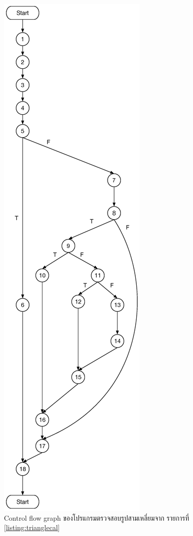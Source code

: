 \documentclass[12pt,a4paper]{article}
\renewcommand{\lstlistingname}{รายการที่}
\begin{document}
\begin{figure}[h!]
    \label{fig:flowgraph}
    \centering
    \includegraphics[height=0.8\textheight]{img/graph-testing.eps}
    \caption{Control flow graph ของโปรแกรมตรวจสอบรูปสามเหลี่ยมจาก \lstlistingname\, \ref{listing:trianglecal}}
\end{figure}
\end{document}
